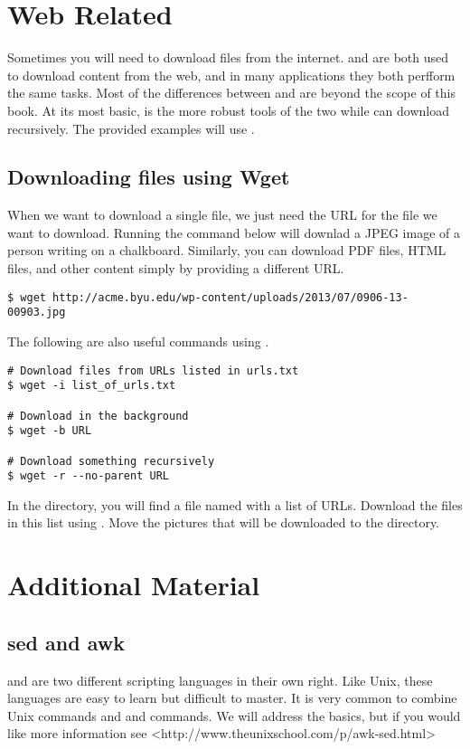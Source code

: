 \section*{Web Related}
Sometimes you will need to download files from the internet.
 and  are both used to download content from the web, and in many applications they both perfform the same tasks.
Most of the differences between  and  are beyond the scope of this book. 
At its most basic,  is the more robust tools of the two while  can download recursively.
The provided examples will use .

\subsection*{Downloading files using Wget}

When we want to download a single file, we just need the URL for the file we want to download.
Running the command below will downlad a JPEG image of a person writing on a chalkboard.
Similarly, you can download PDF files, HTML files, and other content simply by providing a different URL. 

\begin{lstlisting}
$ wget http://acme.byu.edu/wp-content/uploads/2013/07/0906-13-00903.jpg
\end{lstlisting}

The following are also useful commands using .

\begin{lstlisting}
# Download files from URLs listed in urls.txt
$ wget -i list_of_urls.txt

# Download in the background
$ wget -b URL

# Download something recursively
$ wget -r --no-parent URL
\end{lstlisting}

\begin{problem}
In the  directory, you will find a file named  with a list of URLs.
Download the files in this list using .
Move the pictures that will be downloaded to the  directory.
\end{problem}

\section*{Additional Material}

\subsection*{sed and awk}
 and  are two different scripting languages in their own right.
Like Unix, these languages are easy to learn but difficult to master.
It is very common to combine Unix commands and  and  commands.
We will address the basics, but if you would like more information see <http://www.theunixschool.com/p/awk-sed.html>

